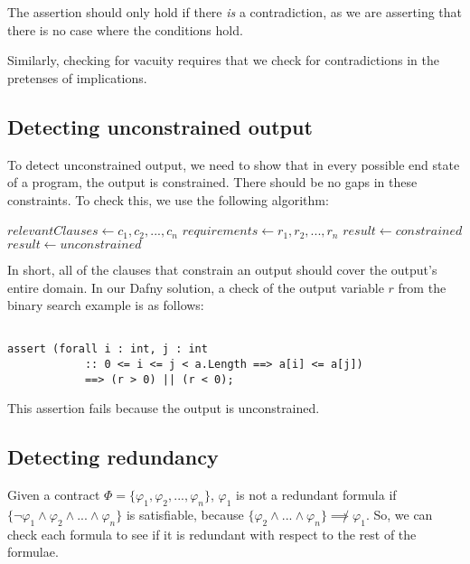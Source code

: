\documentclass[sigplan,screen,anonymous]{acmart}
\begin{document}
The assertion should only hold if there \emph{is} a contradiction, as we are asserting that there is no case where the conditions hold.

Similarly, checking for vacuity requires that we check for contradictions in the pretenses of implications.

\subsection{Detecting unconstrained output}

To detect unconstrained output, we need to show that in every possible end state of a program,
the output is constrained. There should be no gaps in these constraints. To check this, we use the following algorithm:

\begin{algorithmic}

    \State $relevantClauses \gets c_{1}, c_{2}, ..., c_{n}$ 
    \State $requirements \gets r_{1}, r_{2}, ..., r_{n}$
        \State $result \gets constrained$
    \Else
        \State $result \gets unconstrained$
    \EndIf
\EndFor

\end{algorithmic}

In short, all of the clauses that constrain an output should cover the output's entire domain. In our
Dafny solution, a check of the output variable \(r\) from the binary search example is as follows:

\begin{lstlisting}[language=dafny]

assert (forall i : int, j : int
            :: 0 <= i <= j < a.Length ==> a[i] <= a[j])
            ==> (r > 0) || (r < 0);

\end{lstlisting}

This assertion fails because the output is unconstrained.

\subsection{Detecting redundancy}

Given a contract \(\Phi = \{\varphi_{1}, \varphi_{2}, ..., \varphi_{n}\}\),
\(\varphi_{1}\) is not a redundant formula if \(\{\neg \varphi_{1} \land \varphi_{2} \land ... \land \varphi_{n}\}\)
is satisfiable, because \(\{\varphi_{2} \land ... \land \varphi_{n}\} \not\implies \varphi_{1}\). So, we can check
each formula to see if it is redundant with respect to the rest of the formulae.
\end{document}
